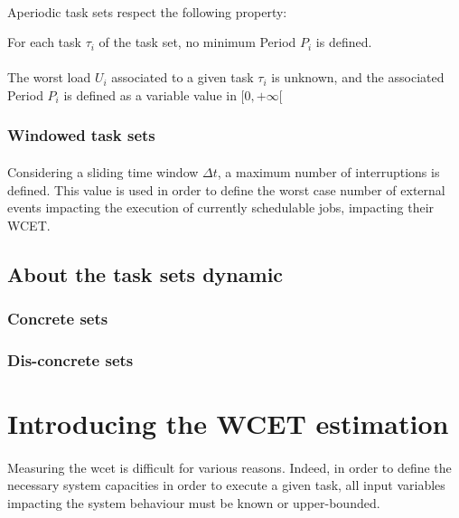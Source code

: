 \paragraph{}
Aperiodic task sets respect the following property:\\
\begin{property}
For each task $\tau_i$ of the task set, no minimum Period $P_{i}$ is defined.
\end{property}

\paragraph{}
The worst load $U_i$ associated to a given task $\tau_i$ is unknown, and the associated Period
$P_i$ is defined as a variable value in $[0, +\infty[$

\subsubsection{Windowed task sets}

\paragraph{}
Considering a sliding time window ${\Delta}t$, a maximum number of interruptions is defined. This
value is used in order to define the worst case number of external events impacting the execution
of currently schedulable jobs, impacting their WCET.

\subsection{About the task sets dynamic}

\subsubsection{Concrete sets}

\subsubsection{Dis-concrete sets}

\section{Introducing the WCET estimation}

\paragraph{}
Measuring the \gls{wcet} is difficult for various reasons. Indeed, in order to define the necessary
system capacities in order to execute a given task, all input variables impacting the system
behaviour must be known or upper-bounded.

